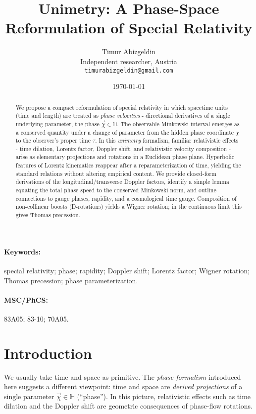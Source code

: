 \documentclass[11pt]{article}
\title{Unimetry: A Phase-Space Reformulation of Special Relativity}
\author{Timur Abizgeldin\\ \small Independent researcher, Austria\\ \small \texttt{timurabizgeldin@gmail.com}}
\date{\today}
\numberwithin{equation}{section}
\begin{document}
\maketitle

\begin{abstract}We propose a compact reformulation of special relativity in which spacetime units (time and length) are treated as \emph{phase velocities} - directional derivatives of a single underlying parameter, the phase $\vec{\chi}\in\mathbb{H}$. The observable Minkowski interval emerges as a conserved quantity under a change of parameter from the hidden phase coordinate $\chi$ to the observer's proper time $\tau$. In this \emph{unimetry} formalism, familiar relativistic effects - time dilation, Lorentz factor, Doppler shift, and relativistic velocity composition - arise as elementary projections and rotations in a Euclidean phase plane. Hyperbolic features of Lorentz kinematics reappear after a reparameterization of time, yielding the standard relations without altering empirical content. We provide closed-form derivations of the longitudinal/transverse Doppler factors, identify a simple lemma equating the total phase speed to the conserved Minkowski norm, and outline connections to gauge phases, rapidity, and a cosmological time gauge. Composition of non-collinear boosts (D-rotations) yields a Wigner rotation; in the continuous limit this gives Thomas precession.\end{abstract}

\paragraph{Keywords:} special relativity; phase; rapidity; Doppler shift; Lorentz factor; Wigner rotation; Thomas precession; phase parameterization.

\paragraph{MSC/PhCS:} 83A05; 83-10; 70A05.

\section{Introduction}
We usually take time and space as primitive. The \emph{phase formalism} introduced here suggests a different viewpoint: time and space are \emph{derived projections} of a single parameter $\vec{\chi}\in\mathbb{H}$ (``phase''). In this picture, relativistic effects such as time dilation and the Doppler shift are geometric consequences of phase-flow rotations.
\end{document}
